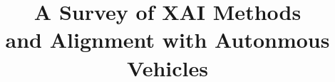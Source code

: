 \documentclass{IEEEtran}
\begin{document}
\title{A Survey of XAI Methods\\and Alignment with Autonmous Vehicles}
\author{
    \\
}
\maketitle









\nocite{*}

 
\end{document}

